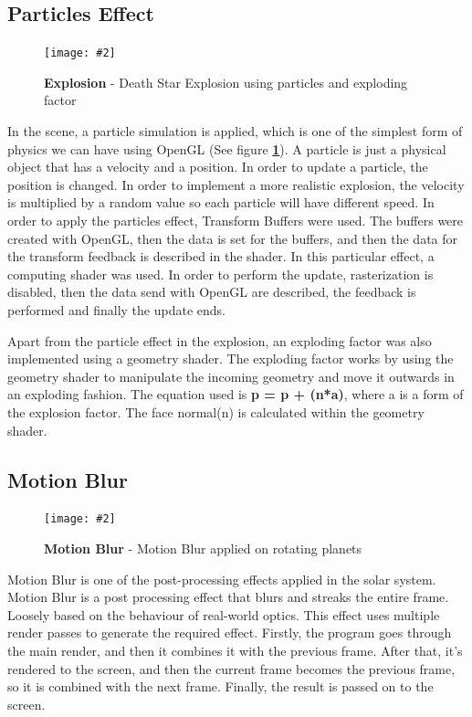\documentclass[10pt, a4paper]{article}
\newcommand{\figuremacro}[5]{
    \begin{figure}[#1]
        \centering
        \texttt{[image: \#2]}
        \caption[#3]{\textbf{#3}#4}
        \label{fig:#2}
    \end{figure}
}
\begin{document}
\subsection{Particles Effect}

	\figuremacro{H}{Explosion}{Explosion}{ - Death Star Explosion using particles and exploding factor}{0.985}
	
	In the scene, a particle simulation is applied, which is one of the simplest form of physics we can have using OpenGL (See figure \textbf{\ref{fig:Explosion}}). A particle is just a physical object that has a velocity and a position. In order to update a particle, the position is changed. In order to implement a more realistic explosion, the velocity is multiplied by a random value so each particle will have different speed. In order to apply the particles effect, Transform Buffers were used. The buffers were created with OpenGL, then the data is set for the buffers, and then the data for the transform feedback is described in the shader. In this particular effect, a computing shader was used. In order to perform the update, rasterization is disabled, then the data send with OpenGL are described, the feedback is performed and finally the update ends.
	
	Apart from the particle effect in the explosion, an exploding factor was also implemented using a geometry shader. The exploding factor works by using the geometry shader to manipulate the incoming geometry and move it outwards in an exploding fashion. The equation used is \textbf{p = p + (n*a)}, where a is a form of the explosion factor. The face normal(n) is calculated within the geometry shader.

\subsection{Motion Blur}
	\figuremacro{H}{Motion_Blur}{Motion Blur}{ - Motion Blur applied on rotating planets}{1.0}
	
	Motion Blur is one of the post-processing effects applied in the solar system. Motion Blur is a post processing effect that blurs and streaks the entire frame. Loosely based on the behaviour of real-world optics. This effect uses multiple render passes to generate the required effect. Firstly, the program goes through the main render, and then it combines it with the previous frame. After that, it's rendered to the screen, and then the current frame becomes the previous frame, so it is combined with the next frame. Finally, the result is passed on to the screen.
	
\end{document}
